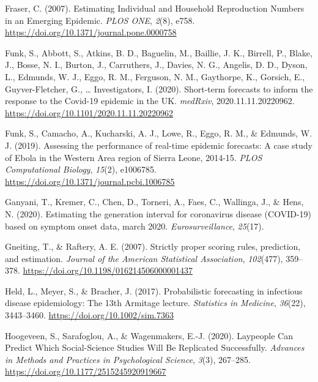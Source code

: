 \documentclass[
]{article}
\newlength{\cslhangindent}
\newlength{\cslentryspacingunit} %
\newenvironment{CSLReferences}[2] %
 {%
  \setlength{\parindent}{0pt}
  \ifodd #1
  \let\oldpar\par
  \def\par{\hangindent=\cslhangindent\oldpar}
  \fi
  \setlength{\parskip}{#2\cslentryspacingunit}
 }%
 {}
\begin{document}
\begin{CSLReferences}{1}{0}
\leavevmode{}%
Fraser, C. (2007). Estimating {Individual} and {Household Reproduction Numbers} in an {Emerging Epidemic}. \emph{PLOS ONE}, \emph{2}(8), e758. \url{https://doi.org/10.1371/journal.pone.0000758}

\leavevmode{}%
Funk, S., Abbott, S., Atkins, B. D., Baguelin, M., Baillie, J. K., Birrell, P., Blake, J., Bosse, N. I., Burton, J., Carruthers, J., Davies, N. G., Angelis, D. D., Dyson, L., Edmunds, W. J., Eggo, R. M., Ferguson, N. M., Gaythorpe, K., Gorsich, E., Guyver-Fletcher, G., \ldots{} Investigators, I. (2020). Short-term forecasts to inform the response to the {Covid}-19 epidemic in the {UK}. \emph{medRxiv}, 2020.11.11.20220962. \url{https://doi.org/10.1101/2020.11.11.20220962}

\leavevmode{}%
Funk, S., Camacho, A., Kucharski, A. J., Lowe, R., Eggo, R. M., \& Edmunds, W. J. (2019). Assessing the performance of real-time epidemic forecasts: A case study of {Ebola} in the {Western Area} region of {Sierra Leone}, 2014-15. \emph{PLOS Computational Biology}, \emph{15}(2), e1006785. \url{https://doi.org/10.1371/journal.pcbi.1006785}

\leavevmode{}%
Ganyani, T., Kremer, C., Chen, D., Torneri, A., Faes, C., Wallinga, J., \& Hens, N. (2020). Estimating the generation interval for coronavirus disease (COVID-19) based on symptom onset data, march 2020. \emph{Eurosurveillance}, \emph{25}(17).

\leavevmode{}%
Gneiting, T., \& Raftery, A. E. (2007). Strictly proper scoring rules, prediction, and estimation. \emph{Journal of the American Statistical Association}, \emph{102}(477), 359--378. \url{https://doi.org/10.1198/016214506000001437}

\leavevmode{}%
Held, L., Meyer, S., \& Bracher, J. (2017). Probabilistic forecasting in infectious disease epidemiology: The 13th {Armitage} lecture. \emph{Statistics in Medicine}, \emph{36}(22), 3443--3460. \url{https://doi.org/10.1002/sim.7363}

\leavevmode{}%
Hoogeveen, S., Sarafoglou, A., \& Wagenmakers, E.-J. (2020). Laypeople {Can Predict Which Social}-{Science Studies Will Be Replicated Successfully}. \emph{Advances in Methods and Practices in Psychological Science}, \emph{3}(3), 267--285. \url{https://doi.org/10.1177/2515245920919667}


\end{CSLReferences}
\end{document}

